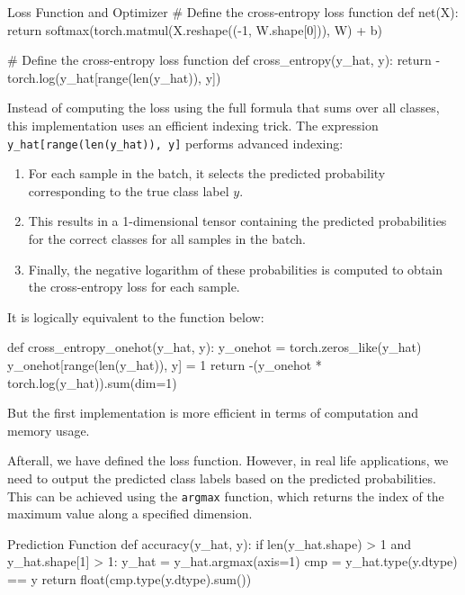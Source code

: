 \begin{pythoncode}{Loss Function and Optimizer}
# Define the cross-entropy loss function
def net(X):
    return softmax(torch.matmul(X.reshape((-1, W.shape[0])), W) + b)

# Define the cross-entropy loss function
def cross_entropy(y_hat, y):
    return -torch.log(y_hat[range(len(y_hat)), y])
\end{pythoncode}

Instead of computing the loss using the full formula that sums over all classes, this implementation uses an efficient indexing trick. The expression \texttt{y\_hat[range(len(y\_hat)), y]} performs advanced indexing:

\begin{enumerate}
    \item For each sample in the batch, it selects the predicted probability corresponding to the true class label \(y\).
    \item This results in a 1-dimensional tensor containing the predicted probabilities for the correct classes for all samples in the batch.
    \item Finally, the negative logarithm of these probabilities is computed to obtain the cross-entropy loss for each sample.
\end{enumerate}

It is logically equivalent to the function below:

\begin{pythoncode}

def cross_entropy_onehot(y_hat, y):
    y_onehot = torch.zeros_like(y_hat)
    y_onehot[range(len(y_hat)), y] = 1
    return -(y_onehot * torch.log(y_hat)).sum(dim=1)
\end{pythoncode}

But the first implementation is more efficient in terms of computation and memory usage.

Afterall, we have defined the loss function. However, in real life applications, we need to output the predicted class labels based on the predicted probabilities. This can be achieved using the \texttt{argmax} function, which returns the index of the maximum value along a specified dimension.

\begin{pythoncode}{Prediction Function}
def accuracy(y_hat, y):
    if len(y_hat.shape) > 1 and y_hat.shape[1] > 1:
        y_hat = y_hat.argmax(axis=1)
    cmp = y_hat.type(y.dtype) == y
    return float(cmp.type(y.dtype).sum())
\end{pythoncode}

